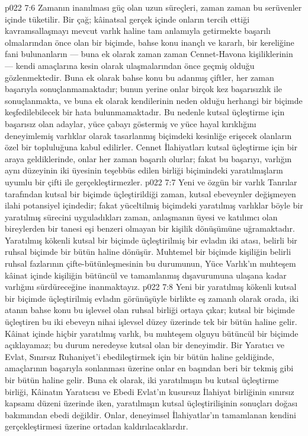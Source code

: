 \vs p022 7:6 Zamanın inanılması güç olan uzun süreçleri, zaman zaman bu serüvenler içinde tüketilir. Bir çağ; kâinatsal gerçek içinde onların tercih ettiği kavramsallaşmayı mevcut varlık haline tam anlamıyla getirmekte başarılı olmalarından önce olan bir biçimde, bahse konu inançlı ve kararlı, bir kereliğine fani bulunanların --- buna ek olarak zaman zaman Cennet\hyp{}Havona kişiliklerinin --- kendi amaçlarına kesin olarak ulaşmalarından önce geçmiş olduğu gözlenmektedir. Buna ek olarak bahse konu bu adanmış çiftler, her zaman başarıyla sonuçlanmamaktadır; bunun yerine onlar birçok kez başarısızlık ile sonuçlanmakta, ve buna ek olarak kendilerinin neden olduğu herhangi bir biçimde keşfedilebilecek bir hata bulunmamaktadır. Bu nedenle kutsal üçleştirme için başarısız olan adaylar, yüce çabayı göstermiş ve yüce hayal kırıklığını deneyimlemiş varlıklar olarak tasarlanmış biçimdeki kesinliğe erişecek olanların özel bir topluluğuna kabul edilirler. Cennet İlahiyatları kutsal üçleştirme için bir araya geldiklerinde, onlar her zaman başarılı olurlar; fakat bu başarıyı, varlığın aynı düzeyinin iki üyesinin teşebbüs edilen birliği biçimindeki yaratılmışların uyumlu bir çifti ile gerçekleştirmezler.
\vs p022 7:7 Yeni ve özgün bir varlık Tanrılar tarafından kutsal bir biçimde üçleştirildiği zaman, kutsal ebeveynler değişmeyen ilahi potansiyel içindedir; fakat yüceltilmiş biçimdeki yaratılmış varlıklar böyle bir yaratılmış sürecini uyguladıkları zaman, anlaşmanın üyesi ve katılımcı olan bireylerden bir tanesi eşi benzeri olmayan bir kişilik dönüşümüne uğramaktadır. Yaratılmış kökenli kutsal bir biçimde üçleştirilmiş bir evladın iki atası, belirli bir ruhsal biçimde bir bütün haline dönüşür. Muhtemel bir biçimde kişiliğin belirli ruhsal fazlarının çifte\hyp{}bütünleşmesinin bu durumunun, Yüce Varlık’ın muhteşem kâinat içinde kişiliğin bütüncül ve tamamlanmış dışavurumuna ulaşana kadar varlığını sürdüreceğine inanmaktayız.
\vs p022 7:8 Yeni bir yaratılmış kökenli kutsal bir biçimde üçleştirilmiş evladın görünüşüyle birlikte eş zamanlı olarak orada, iki atanın bahse konu bu işlevsel olan ruhsal birliği ortaya çıkar; kutsal bir biçimde üçleştiren bu iki ebeveyn nihai işlevsel düzey üzerinde tek bir bütün haline gelir. Kâinat içinde hiçbir yaratılmış varlık, bu muhteşem olguyu bütüncül bir biçimde açıklayamaz; bu durum neredeyse kutsal olan bir deneyimdir. Bir Yaratıcı ve Evlat, Sınırsız Ruhaniyet’i ebedileştirmek için bir bütün haline geldiğinde, amaçlarının başarıyla sonlanması üzerine onlar en başından beri bir tekmiş gibi bir bütün haline gelir. Buna ek olarak, iki yaratılmışın bu kutsal üçleştirme birliği, Kâinatın Yaratıcısı ve Ebedi Evlat’ın kusursuz İlahiyat birliğinin sınırsız kapsamı düzeni üzerinde iken, yaratılmışın kutsal üçleştirilişinin sonuçları doğası bakımından ebedi değildir. Onlar, deneyimsel İlahiyatlar’ın tamamlanan kendini gerçekleştirmesi üzerine ortadan kaldırılacaklardır.
